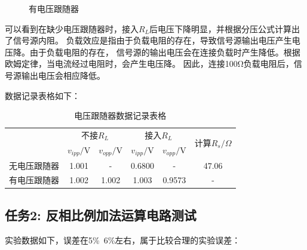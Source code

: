 \documentclass[a4paper,11pt,UTF8]{article}
\begin{document}
\begin{figure}[H]
	\centering
	\setcounter{subfigure}{0}
	\caption{有电压跟随器}
\end{figure}

可以看到在缺少电压跟随器时，接入$R_L$后电压下降明显，并根据分压公式计算出了信号源内阻。
负载效应是指由于负载电阻的存在，导致信号源输出电压产生电压降。由于负载电阻的存在，
信号源的输出电压会在连接负载时产生降低。根据欧姆定律，当电流经过电阻时，会产生电压降。
因此，连接100Ω负载电阻后，信号源输出电压会相应降低。

数据记录表格如下：

\begin{table}[h]
	\centering
	\caption{电压跟随器数据记录表格}
	\label{label3}
	\begin{tabular}{|c|c|c|c|c|c|}
		\hline
		\multirow{2}{*}{}   & \multicolumn{2}{c|}{不接$R_L$} & \multicolumn{2}{c|}{接入$R_L$} &
		\multirow{2}{*}{计算$R_s/\Omega$}\\
		\cline{2-5}
		\multirow{2}{*}{} & $v_{ipp}/$V & $v_{opp}/$V & $v_{ipp}/$V & $v_{opp}/$V & \multirow{2}{*}{}\\
		\hline
		无电压跟随器 & 1.001 & - & 0.6800 & - & 47.06\\
		\hline
		有电压跟随器 & 1.002 & 1.002 & 1.003 & 0.9573 & - \\
		\hline
	\end{tabular}
\end{table} 

\subsection{任务2: 反相比例加法运算电路测试}
实验数据如下，误差在5\%~6\%左右，属于比较合理的实验误差：
\end{document}

